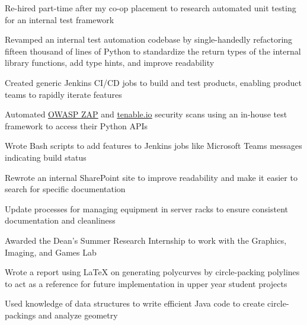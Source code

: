 \begin{bullets}
    \item Re-hired part-time after my co-op placement to research automated unit testing for an internal test framework
    \item Revamped an internal test automation codebase by single-handedly refactoring fifteen thousand of lines of Python to standardize the return types of the internal library functions, add type hints, and improve readability
    \item Created generic Jenkins CI/CD jobs to build and test products, enabling product teams to rapidly iterate features
    \item Automated \href{https://www.zaproxy.org/}{\underline{OWASP ZAP}} and \href{https://www.tenable.com/products/tenable-io}{\underline{tenable.io}} security scans using an in-house test framework to access their Python APIs
    \item Wrote Bash scripts to add features to Jenkins jobs like Microsoft Teams messages indicating build status
    \item Rewrote an internal SharePoint site to improve readability and make it easier to search for specific documentation
    \item Update processes for managing equipment in server racks to ensure consistent documentation and cleanliness
\end{bullets}

\hbox{}

\begin{bullets}
    \item Awarded the Dean's Summer Research Internship to work with the Graphics, Imaging, and Games Lab
    \item Wrote a report using \LaTeX\hbox{} on generating polycurves by circle-packing polylines to act as a reference for future implementation in upper year student projects
    \item Used knowledge of data structures to write efficient Java code to create circle-packings and analyze geometry
\end{bullets}


